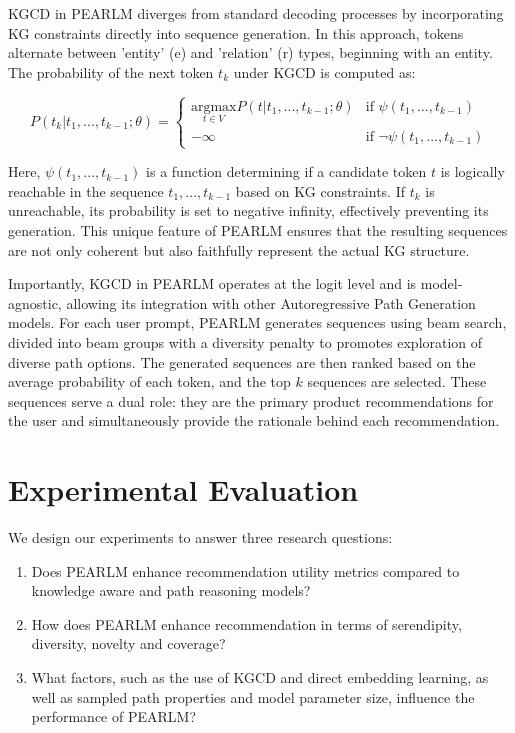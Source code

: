 \documentclass[sigconf]{acmart}
\def\threedigits#1{\number#1}
\begin{document}
KGCD in PEARLM diverges from standard decoding processes by incorporating KG constraints directly into sequence generation. In this approach, tokens alternate between 'entity' (e) and 'relation' (r) types, beginning with an entity. The probability of the next token $t_k$ under KGCD is computed as:

$$
P(t_k | t_1, ..., t_{k-1}; \theta) =
\begin{cases} 
\underset{t \in V}{\text{argmax}} P(t | t_1, ..., t_{k-1}; \theta) & \text{if } \psi(t_1,...,t_{k-1}) \\
-\infty & \text{if } \neg \psi(t_1,...,t_{k-1})
\end{cases}
$$

Here, $\psi(t_1,...,t_{k-1})$ is a function determining if a candidate token $t$ is logically reachable in the sequence $t_1,...,t_{k-1}$ based on KG constraints. If $t_k$ is unreachable, its probability is set to negative infinity, effectively preventing its generation. This unique feature of PEARLM ensures that the resulting sequences are not only coherent but also faithfully represent the actual KG structure.

Importantly, KGCD in PEARLM operates at the logit level and is model-agnostic, allowing its integration with other Autoregressive Path Generation models. For each user prompt, PEARLM generates sequences using beam search, divided into beam groups with a diversity penalty to promotes exploration of diverse path options. The generated sequences are then ranked based on the average probability of each token, and the top $k$ sequences are selected. These sequences serve a dual role: they are the primary product recommendations for the user and simultaneously provide the rationale behind each recommendation. 

\section{Experimental Evaluation}
We design our experiments to answer three research questions:

\begin{enumerate}[label={\textbf{RQ\protect\threedigits{\theenumi}}}, leftmargin=*]
\item Does PEARLM enhance recommendation utility metrics compared to  knowledge aware and path reasoning models?
\item How does PEARLM enhance recommendation in terms of serendipity, diversity, novelty and coverage?
\item What factors, such as the use of KGCD and direct embedding learning, as well as sampled path properties and model parameter size, influence the performance of PEARLM?


\end{enumerate}
\end{document}
